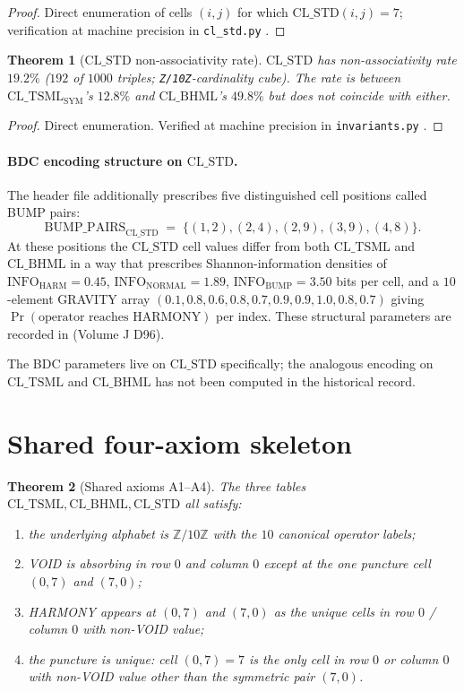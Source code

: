 \documentclass[11pt,reqno]{amsart}
\newtheorem{theorem}{Theorem}[section]
\theoremstyle{definition}
\newcommand{\Z}{\mathbb{Z}}
\newcommand{\TSML}{\mathrm{CL\_TSML}}
\newcommand{\BHML}{\mathrm{CL\_BHML}}
\newcommand{\STDx}{\mathrm{CL\_STD}}
\DeclareMathOperator{\HARM}{HARM}
\begin{document}
\begin{proof}
Direct enumeration of cells $(i, j)$ for which $\STDx(i, j) = 7$;
verification at machine precision in
\texttt{cl\_std.py} \cite{Gen13Foundations}.
\end{proof}

\begin{theorem}[$\STDx$ non-associativity rate]
\label{thm:std-nonassoc}
$\STDx$ has non-associativity rate $19.2\%$ ($192$ of $1000$
triples; \texttt{Z/10Z}-cardinality cube). The rate is between
$\TSML_{\mathrm{SYM}}$'s $12.8\%$ and $\BHML$'s $49.8\%$ but does
not coincide with either.
\end{theorem}

\begin{proof}
Direct enumeration. Verified at machine precision in
\texttt{invariants.py} \cite{Gen13Foundations}.
\end{proof}

\paragraph{BDC encoding structure on $\STDx$.}

The header file additionally prescribes five distinguished cell
positions called BUMP pairs:
\[
  \mathrm{BUMP\_PAIRS}_{\STDx} \;=\;
  \{(1, 2), (2, 4), (2, 9), (3, 9), (4, 8)\}.
\]
At these positions the $\STDx$ cell values differ from both
$\TSML$ and $\BHML$ in a way that prescribes Shannon-information
densities of $\mathrm{INFO}_{\HARM} = 0.45$,
$\mathrm{INFO}_{\mathrm{NORMAL}} = 1.89$,
$\mathrm{INFO}_{\mathrm{BUMP}} = 3.50$ bits per cell, and a
$10$-element GRAVITY array
$(0.1, 0.8, 0.6, 0.8, 0.7, 0.9, 0.9, 1.0, 0.8, 0.7)$ giving
$\Pr(\text{operator reaches HARMONY})$ per index. These structural
parameters are recorded in \cite{Gen13Foundations} (Volume J D96).

The BDC parameters live on $\STDx$ specifically; the analogous
encoding on $\TSML$ and $\BHML$ has not been computed in the
historical record.

\section{Shared four-axiom skeleton}
\label{sec:axioms}

\begin{theorem}[Shared axioms A1--A4]
\label{thm:shared-axioms}
The three tables $\TSML, \BHML, \STDx$ all satisfy:
\begin{enumerate}[label=\textup{(A\arabic*)},leftmargin=*]
\item the underlying alphabet is $\Z/10\Z$ with the $10$
  canonical operator labels;
\item VOID is absorbing in row $0$ and column $0$ except at the
  one puncture cell $(0, 7)$ and $(7, 0)$;
\item HARMONY appears at $(0, 7)$ and $(7, 0)$ as the unique cells
  in row $0$ / column $0$ with non-VOID value;
\item the puncture is unique: cell $(0, 7) = 7$ is the only cell in
  row $0$ or column $0$ with non-VOID value other than the symmetric
  pair $(7, 0)$.
\end{enumerate}
\end{theorem}
\end{document}
